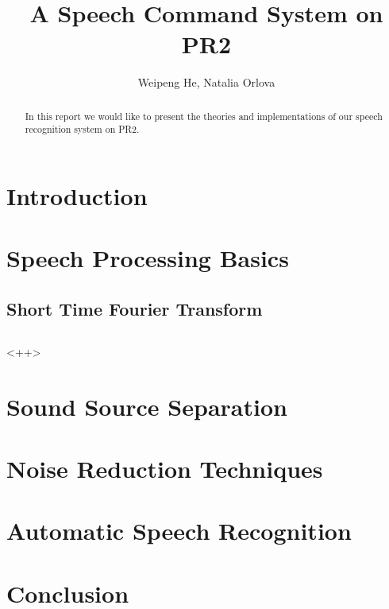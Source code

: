 \documentclass[11pt,a4paper]{report}
\begin{document}
\title{A Speech Command System on PR2}
\author{Weipeng He, Natalia Orlova}
\maketitle

\begin{abstract}
  In this report we would like to present the theories and implementations of our speech recognition system on PR2.  
\end{abstract}

\tableofcontents

\chapter{Introduction}

\chapter{Speech Processing Basics}
\section{Short Time Fourier Transform}
\section{}<++>

\chapter{Sound Source Separation}

\chapter{Noise Reduction Techniques}

\chapter{Automatic Speech Recognition}

\chapter{Conclusion}
\end{document}
